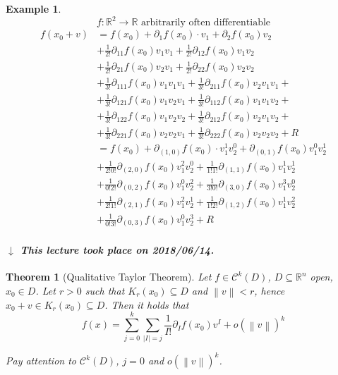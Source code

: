 \documentclass{article}
\newtheorem{theorem}{Theorem}  \numberwithin{theorem}{section}
\newtheorem{example}{Example}  \numberwithin{example}{section}
\newcommand{\norm}[1]{\left\|#1\right\|}
\newcommand{\card}[1]{\left|#1\right|}
\newcommand{\dateref}[1]{%
  \begin{mdframed}[backgroundcolor=gray!10,innerbottommargin=0pt,innertopmargin=0pt]
    \paragraph{\textit{$\downarrow$ This lecture took place on #1.}}%
  \end{mdframed}%
}
\begin{document}
\begin{example}
  \[ f: \mathbb R^2 \to \mathbb R \text{ arbitrarily often differentiable} \]
  \begin{align*}
    f(x_0 + v) &= f(x_0) + \partial_1 f(x_0) \cdot v_1 + \partial_2 f(x_0) v_2 \\
      &+ \frac1{2!} \partial_{11} f(x_0) v_1 v_1 + \frac{1}{2!} \partial_{12} f(x_0) v_1 v_2 \\
      &+ \frac{1}{2!} \partial_{21} f(x_0) v_2 v_1 + \frac{1}{2!} \partial_{22} f(x_0) v_2 v_2 \\
      &+ \frac{1}{3!} \partial_{111} f(x_0) v_1 v_1 v_1 + \frac{1}{3!} \partial_{211} f(x_0) v_2 v_1 v_1 + \\
      &+ \frac{1}{3!} \partial_{121} f(x_0) v_1 v_2 v_1 + \frac{1}{3!} \partial_{112} f(x_0) v_1 v_1 v_2 + \\
      &+ \frac{1}{3!} \partial_{122} f(x_0) v_1 v_2 v_2 + \frac{1}{3!} \partial_{212} f(x_0) v_2 v_1 v_2 + \\
      &+ \frac{1}{3!} \partial_{221} f(x_0) v_2 v_2 v_1 + \frac{1}{3!} \partial_{222} f(x_0) v_2 v_2 v_2 + R \\
      &= f(x_0) + \partial_{(1,0)} f(x_0) \cdot v_1^1 v_2^0 + \partial_{(0,1)} f(x_0) v_1^0 v_2^1 \\
      &+ \frac{1}{2! 0!} \partial_{(2,0)} f(x_0) v_1^2 v_2^0 + \frac{1}{1! 1!} \partial_{(1,1)} f(x_0) v_1^1 v_2^1 \\
      &+ \frac{1}{0! 2!} \partial_{(0,2)} f(x_0) v_1^0 v_2^2 + \frac{1}{3! 0!} \partial_{(3,0)} f(x_0) v_1^3 v_2^0 \\
      &+ \frac{1}{2! 1!} \partial_{(2,1)} f(x_0) v_1^2 v_2^1 + \frac{1}{1! 2!} \partial_{(1,2)} f(x_0) v_1^1 v_2^2 \\
      &+ \frac{1}{0! 3!} \partial_{(0,3)} f(x_0) v_1^0 v_2^3 + R
  \end{align*}
\end{example}

\dateref{2018/06/14}

\begin{theorem}[Qualitative Taylor Theorem] %
  Let $f \in \mathcal C^k(D)$, $D \subseteq \mathbb R^n$ open, $x_0 \in D$.
  Let $r > 0$ such that $K_r(x_0) \subseteq D$ and $\norm{v} < r$, hence $x_0 + v \in K_r(x_0) \subseteq D$.
  Then it holds that
  \[ f(x) = \sum_{j=0}^k \sum_{\card{I} = j} \frac{1}{I!} \partial_I f(x_0) v^I + o(\norm{v})^k \]

  Pay attention to $\mathcal C^k(D)$, $j=0$ and $o(\norm{v})^k$.
\end{theorem}
\end{document}
